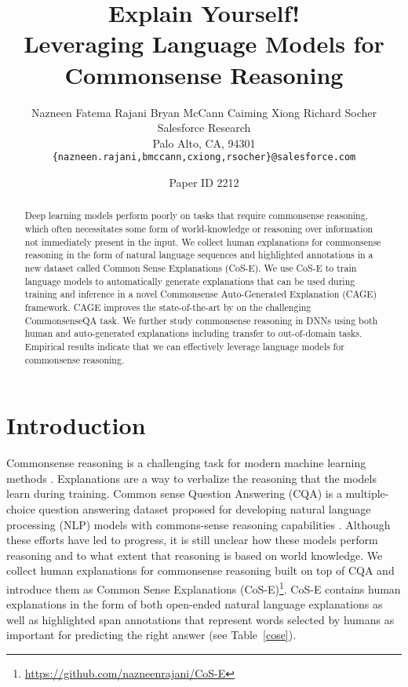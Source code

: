 \documentclass[11pt,a4paper]{article}
\title{Explain Yourself! \\Leveraging Language Models for Commonsense Reasoning}
\author{Nazneen Fatema Rajani \quad Bryan McCann \quad Caiming Xiong \quad Richard Socher \\
  Salesforce Research \\
  Palo Alto, CA, 94301\\
  \texttt{\{nazneen.rajani,bmccann,cxiong,rsocher\}@salesforce.com}
  }
\date{Paper ID 2212}
\begin{document}
\maketitle
\begin{abstract}
Deep learning models perform poorly on tasks that require commonsense reasoning, 
which often necessitates some form of world-knowledge or reasoning over information not immediately present in the input.
We collect human explanations for commonsense reasoning in the form of natural language sequences and highlighted annotations in  
a new dataset called Common Sense Explanations (CoS-E).
We use CoS-E to train language models to automatically generate explanations that can be used during training and inference in a novel Commonsense Auto-Generated Explanation (CAGE) framework. 
CAGE improves the state-of-the-art by  on the challenging CommonsenseQA task. 
We further study commonsense reasoning in DNNs using both human and auto-generated explanations including transfer to out-of-domain tasks.
Empirical results indicate that we can effectively leverage language models for commonsense reasoning.
\end{abstract}

\section{Introduction} 
\vspace{-0.2cm}
\label{introduction}
Commonsense reasoning is a challenging task for modern machine learning methods \citep{zhong2018improving,talmor2018commonsenseqa}. 
Explanations are a way to verbalize the reasoning that the models learn during training.
Common sense Question Answering (CQA) is a multiple-choice question answering dataset proposed for developing natural language processing (NLP) models with commons-sense reasoning capabilities \citep{talmor2018commonsenseqa}. 
Although these efforts have led to progress, it is still unclear how these models perform reasoning and to what extent that reasoning is based on world knowledge. 
We collect human explanations for commonsense reasoning built on top of CQA and introduce them as Common Sense Explanations (CoS-E)\footnote{\url{https://github.com/nazneenrajani/CoS-E}}. 
CoS-E contains human explanations in the form of both open-ended natural language explanations as well as highlighted span annotations that represent words selected by humans as important for predicting the right answer (see Table~\ref{cose}).
\end{document}
